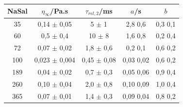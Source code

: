 
	\begin{table}[h]
		{%
			\begin{tabular}{c | c c c c}
				\toprule
                NaSal  &  \(\eta_\infty\)/Pa.s          &  \(\tau_{rel,2}\)/ms         & \(a\)/s      &  \(b\) \\ \midrule
				35    &  0,14            \(\pm\) 0,05  &  5                \(\pm\) 1   & 2,8     0,6  &  0,3 0,1 \\
				60    &  0,5             \(\pm\) 0,4   &  10               \(\pm\) 8   & 1,6     0,8  &  0,2 0,4 \\
				72    &  0,07            \(\pm\) 0,02  &  1,8              \(\pm\) 0,6 & 0,2     0,1  &  0,6 0,2 \\
				100   &  0,023           \(\pm\) 0,004 &  0,45             \(\pm\) 0,08& 0,03    0,02 &  0,6 0,2 \\
				189   &  0,04            \(\pm\) 0,02  &  0,7              \(\pm\) 0,3 & 0,05    0,06 &  0,9 0,4 \\
				260   &  0,10            \(\pm\) 0,04  &  2,0              \(\pm\) 0,8 & 0,10    0,09 &  1,0 0,4 \\
				365   &  0,07            \(\pm\) 0,01  &  1,4              \(\pm\) 0,3 & 0,09    0,04 &  0,8 0,2 \\ \bottomrule
			\end{tabular}
		}{} 
	\end{table}  

